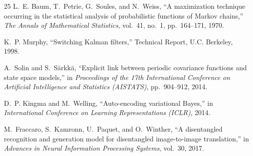 \documentclass[conference]{IEEEtran}
\begin{document}
\begin{thebibliography}{25}
L.~E. Baum, T.~Petrie, G.~Soules, and N.~Weiss, ``A maximization technique occurring in the statistical analysis of probabilistic functions of Markov chains,'' \textit{The Annals of Mathematical Statistics}, vol.~41, no.~1, pp.~164--171, 1970.

K.~P. Murphy, ``Switching Kalman filters,'' Technical Report, U.C. Berkeley, 1998.

A.~Solin and S.~S{\"a}rkk{\"a}, ``Explicit link between periodic covariance functions and state space models,'' in \textit{Proceedings of the 17th International Conference on Artificial Intelligence and Statistics (AISTATS)}, pp.~904--912, 2014.

D.~P. Kingma and M.~Welling, ``Auto-encoding variational Bayes,'' in \textit{International Conference on Learning Representations (ICLR)}, 2014.

M.~Fraccaro, S.~Kamronn, U.~Paquet, and O.~Winther, ``A disentangled recognition and generation model for disentangled image-to-image translation,'' in \textit{Advances in Neural Information Processing Systems}, vol.~30, 2017.

\end{thebibliography}
\end{document}
